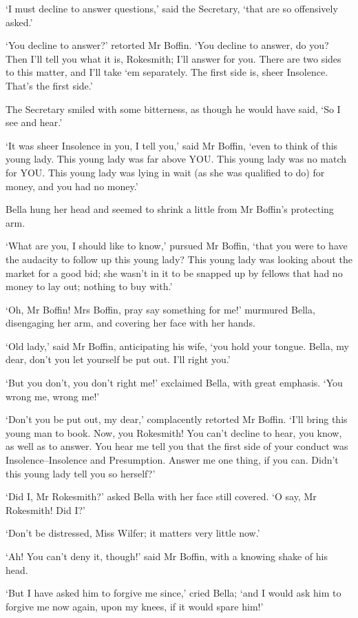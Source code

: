 ‘I must decline to answer questions,’ said the Secretary, ‘that are so
offensively asked.’

‘You decline to answer?’ retorted Mr Boffin. ‘You decline to answer,
do you? Then I’ll tell you what it is, Rokesmith; I’ll answer for you.
There are two sides to this matter, and I’ll take ‘em separately. The
first side is, sheer Insolence. That’s the first side.’

The Secretary smiled with some bitterness, as though he would have said,
‘So I see and hear.’

‘It was sheer Insolence in you, I tell you,’ said Mr Boffin, ‘even to
think of this young lady. This young lady was far above YOU. This young
lady was no match for YOU. This young lady was lying in wait (as she was
qualified to do) for money, and you had no money.’

Bella hung her head and seemed to shrink a little from Mr Boffin’s
protecting arm.

‘What are you, I should like to know,’ pursued Mr Boffin, ‘that you were
to have the audacity to follow up this young lady? This young lady was
looking about the market for a good bid; she wasn’t in it to be snapped
up by fellows that had no money to lay out; nothing to buy with.’

‘Oh, Mr Boffin! Mrs Boffin, pray say something for me!’ murmured Bella,
disengaging her arm, and covering her face with her hands.

‘Old lady,’ said Mr Boffin, anticipating his wife, ‘you hold your
tongue. Bella, my dear, don’t you let yourself be put out. I’ll right
you.’

‘But you don’t, you don’t right me!’ exclaimed Bella, with great
emphasis. ‘You wrong me, wrong me!’

‘Don’t you be put out, my dear,’ complacently retorted Mr Boffin. ‘I’ll
bring this young man to book. Now, you Rokesmith! You can’t decline
to hear, you know, as well as to answer. You hear me tell you that the
first side of your conduct was Insolence--Insolence and Presumption.
Answer me one thing, if you can. Didn’t this young lady tell you so
herself?’

‘Did I, Mr Rokesmith?’ asked Bella with her face still covered. ‘O say,
Mr Rokesmith! Did I?’

‘Don’t be distressed, Miss Wilfer; it matters very little now.’

‘Ah! You can’t deny it, though!’ said Mr Boffin, with a knowing shake of
his head.

‘But I have asked him to forgive me since,’ cried Bella; ‘and I would
ask him to forgive me now again, upon my knees, if it would spare him!’

